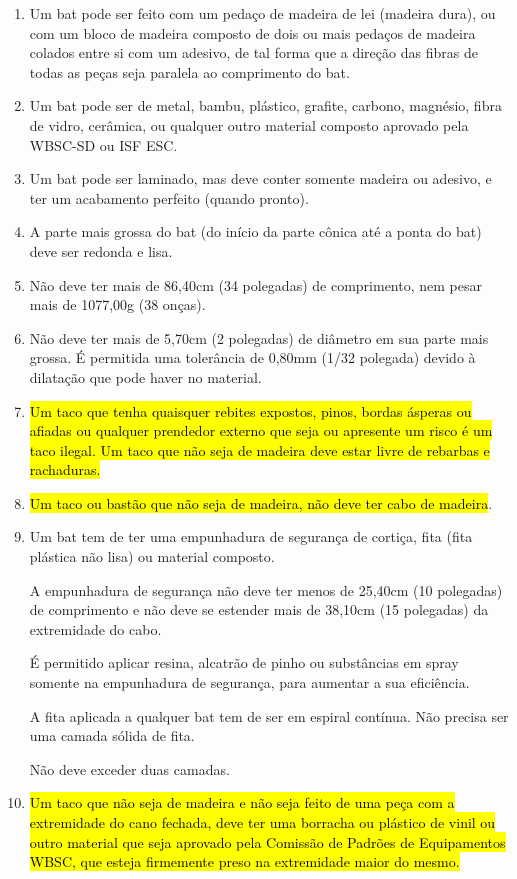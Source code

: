 \begin{enumerate}[label=(\arabic*)]
	\item  Um \gls{bat} pode ser feito com um pedaço de madeira de lei (madeira dura), ou com um bloco de madeira composto de dois ou mais pedaços de madeira colados entre si com um adesivo, de tal forma que a direção das fibras de todas as peças seja paralela ao comprimento do \gls{bat}.
	\item  Um \gls{bat} pode ser de metal, bambu, plástico, grafite, carbono, magnésio, fibra de vidro, cerâmica, ou qualquer outro material composto aprovado pela WBSC-SD ou ISF \gls{ESC}.
	\item  Um \gls{bat} pode ser laminado, mas deve conter somente madeira ou adesivo, e ter um acabamento perfeito (quando pronto).
	\item  A parte mais grossa do \gls{bat} (do início da parte cônica até a ponta do \gls{bat}) deve ser redonda e lisa.
	\item  Não deve ter mais de 86,40cm (34 polegadas) de comprimento, nem pesar mais de 1077,00g (38 onças).
	\item  Não deve ter mais de 5,70cm (2 \textonequarter{} polegadas) de diâmetro em sua parte mais grossa. É permitida uma tolerância de 0,80mm (1/32 polegada) devido à dilatação que pode haver no material.
	\item  \hl{Um taco que tenha quaisquer rebites expostos, pinos, bordas \'asperas ou afiadas ou qualquer prendedor externo que seja ou apresente um risco \'e um taco ilegal. Um taco que n\~ao seja de madeira deve estar livre de rebarbas e rachaduras.}
	\item  \hl{Um taco ou bast\~ao que n\~ao seja de madeira, n\~ao deve ter cabo de madeira}.

	\item  Um \gls{bat} tem de ter uma empunhadura de segurança de cortiça, fita (fita plástica não lisa) ou material composto.

	A empunhadura de segurança não deve ter menos de 25,40cm (10 polegadas) de comprimento e não deve se estender mais de 38,10cm (15 polegadas) da extremidade do cabo.

	É permitido aplicar	resina, alcatrão de pinho ou substâncias em spray somente na empunhadura de segurança, para aumentar a sua eficiência.

	A fita aplicada a qualquer \gls{bat} tem	de ser em espiral contínua. Não precisa ser uma camada sólida de fita.

	Não deve exceder duas camadas.

	\item  \hl{Um taco que n\~ao seja de madeira e n\~ao seja feito de uma pe\c{c}a com a extremidade do cano fechada, deve ter uma borracha ou pl\'astico de vinil ou outro material que seja aprovado pela Comiss\~ao de Padr\~oes de Equipamentos WBSC, que esteja firmemente preso na extremidade maior do mesmo.}


\end{enumerate}
